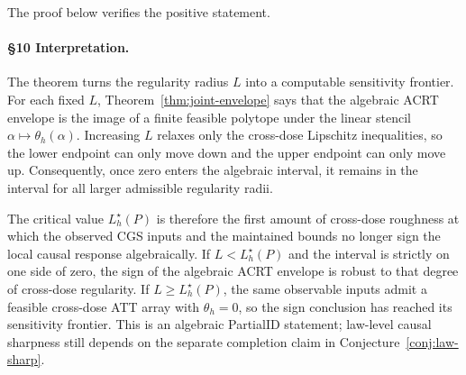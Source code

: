 The proof below verifies the positive statement.

\paragraph{\S10 Interpretation.}
The theorem turns the regularity radius \(L\) into a computable sensitivity
frontier.  For each fixed \(L\), Theorem~\ref{thm:joint-envelope} says that
the algebraic ACRT envelope is the image of a finite feasible polytope under
the linear stencil \(\alpha\mapsto\theta_h(\alpha)\).  Increasing \(L\) relaxes
only the cross-dose Lipschitz inequalities, so the lower endpoint can only move
down and the upper endpoint can only move up.  Consequently, once zero enters
the algebraic interval, it remains in the interval for all larger admissible
regularity radii.

The critical value \(L_h^\star(P)\) is therefore the first amount of
cross-dose roughness at which the observed CGS inputs and the maintained
bounds no longer sign the local causal response algebraically.  If
\(L<L_h^\star(P)\) and the interval is strictly on one side of zero, the sign
of the algebraic ACRT envelope is robust to that degree of cross-dose
regularity.  If \(L\ge L_h^\star(P)\), the same observable inputs admit a
feasible cross-dose ATT array with \(\theta_h=0\), so the sign conclusion has
reached its sensitivity frontier.  This is an algebraic PartialID statement;
law-level causal sharpness still depends on the separate completion claim in
Conjecture~\ref{conj:law-sharp}.

